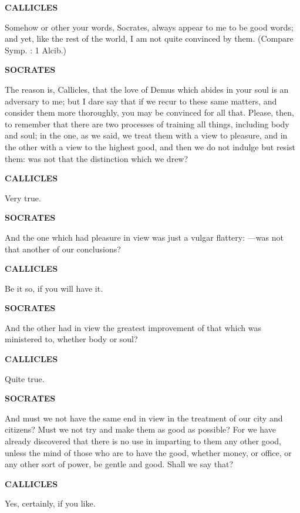 \documentclass[11pt,letter]{article}
\begin{document}
\par \textbf{CALLICLES}
\par   Somehow or other your words, Socrates, always appear to me to be good words; and yet, like the rest of the world, I am not quite convinced by them. (Compare Symp. :  1 Alcib.)

\par \textbf{SOCRATES}
\par   The reason is, Callicles, that the love of Demus which abides in your soul is an adversary to me; but I dare say that if we recur to these same matters, and consider them more thoroughly, you may be convinced for all that. Please, then, to remember that there are two processes of training all things, including body and soul; in the one, as we said, we treat them with a view to pleasure, and in the other with a view to the highest good, and then we do not indulge but resist them:  was not that the distinction which we drew?

\par \textbf{CALLICLES}
\par   Very true.

\par \textbf{SOCRATES}
\par   And the one which had pleasure in view was just a vulgar flattery: —was not that another of our conclusions?

\par \textbf{CALLICLES}
\par   Be it so, if you will have it.

\par \textbf{SOCRATES}
\par   And the other had in view the greatest improvement of that which was ministered to, whether body or soul?

\par \textbf{CALLICLES}
\par   Quite true.

\par \textbf{SOCRATES}
\par   And must we not have the same end in view in the treatment of our city and citizens? Must we not try and make them as good as possible? For we have already discovered that there is no use in imparting to them any other good, unless the mind of those who are to have the good, whether money, or office, or any other sort of power, be gentle and good. Shall we say that?

\par \textbf{CALLICLES}
\par   Yes, certainly, if you like.
\end{document}
